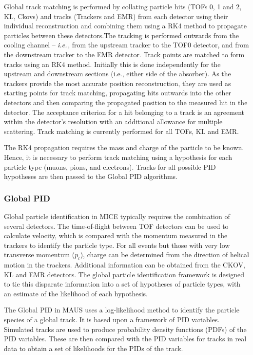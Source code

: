 \documentclass[11pt,a4paper]{article}
\begin{document}
Global track matching is performed by collating particle hits (TOFs 0, 1 and 2, KL, Ckovs) and tracks (Trackers and EMR) from each detector using their individual reconstruction and combining them using a RK4 method to propagate particles between these detectors.The tracking is performed outwards from the cooling channel -- $\emph{i.e.}$, from the upstream tracker to the TOF0 detector, and from the downstream tracker to the EMR detector.
%
Track points are matched to form tracks using an RK4 method. Initially this is done independently for the upstream and downstream sections (i.e., either side of the absorber). As the trackers provide the most accurate position reconstruction, they are used as starting points for track matching, propagating hits outwards into the other detectors and then comparing the propagated position to the measured hit in the detector. The acceptance criterion for a hit belonging to a track is an agreement within the detector's resolution with an additional allowance for multiple scattering.  Track matching is currently performed for all TOFs, KL and EMR. 

The RK4 propagation requires the mass and charge of the particle to be known. Hence, it is necessary to perform track matching using a hypothesis for each particle type (muons, pions, and electrons). Tracks for all possible PID hypotheses are then passed to the Global PID algorithms. 

\subsubsection{Global PID} 

Global particle identification in MICE typically requires the combination of several detectors. The time-of-flight between TOF detectors can be used to calculate velocity, which is compared 
with the momentum measured in the trackers to identify the particle type. For all events but those with very low transverse momentum ($p_t$), charge can be determined from the direction of helical motion in the trackers. Additional information can be obtained from the CKOV, KL and EMR detectors. The global particle identification framework is designed to tie this disparate information into a set of hypotheses of particle types, with an estimate of the likelihood of each hypothesis. 


The Global PID in MAUS uses a log-likelihood method to identify the particle species of a global track. It is based upon a framework of PID variables. Simulated tracks are used to produce probability density functions (PDFs) of the PID variables. These are then compared with the PID variables for tracks in real data to obtain a set of likelihoods for the PIDs of the track.
\end{document}
